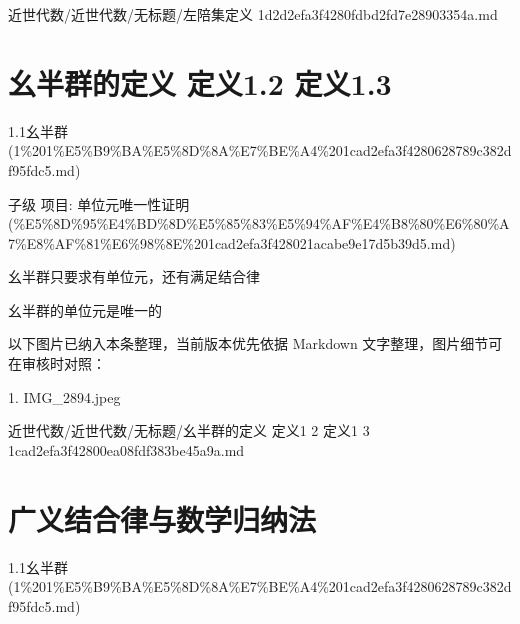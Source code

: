 \begin{note}[来源路径]

近世代数/近世代数/无标题/左陪集定义 1d2d2efa3f4280fdbd2fd7e28903354a.md

\end{note}

\section*{幺半群的定义 定义1.2 定义1.3}

\begin{note}[来源上级主题]

1.1幺半群 (1\%201\%E5\%B9\%BA\%E5\%8D\%8A\%E7\%BE\%A4\%201cad2efa3f4280628789c382df95fdc5.md)

\end{note}

\begin{definition}[幺半群的定义 定义1.2 定义1.3]

子级 项目: 单位元唯一性证明 (\%E5\%8D\%95\%E4\%BD\%8D\%E5\%85\%83\%E5\%94\%AF\%E4\%B8\%80\%E6\%80\%A7\%E8\%AF\%81\%E6\%98\%8E\%201cad2efa3f428021acabe9e17d5b39d5.md)

幺半群只要求有单位元，还有满足结合律

幺半群的单位元是唯一的

\end{definition}

\begin{note}[关联图片]
以下图片已纳入本条整理，当前版本优先依据 Markdown 文字整理，图片细节可在审核时对照：

1. IMG\_2894.jpeg\\

\end{note}

\begin{note}[来源路径]

近世代数/近世代数/无标题/幺半群的定义 定义1 2 定义1 3 1cad2efa3f42800ea08fdf383be45a9a.md

\end{note}

\section*{广义结合律与数学归纳法}

\begin{note}[来源上级主题]

1.1幺半群 (1\%201\%E5\%B9\%BA\%E5\%8D\%8A\%E7\%BE\%A4\%201cad2efa3f4280628789c382df95fdc5.md)

\end{note}

